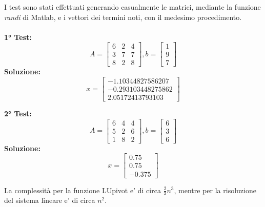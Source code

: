 \documentclass[10pt,a4paper]{article}
\begin{document}
I test sono stati effettuati generando casualmente le matrici, mediante la funzione \textit{randi} di Matlab, e i vettori dei termini noti,
con il medesimo procedimento.
\\ \\
\textbf{1° Test:}
\[
  A =
  \begin{bmatrix}
    6 & 2 & 4 \\
    3 & 7 & 7 \\
    8 & 2 & 8
  \end{bmatrix},
  b =
  \begin{bmatrix}
    1 \\ 9 \\ 7
  \end{bmatrix}
\]
\textbf{Soluzione:}
\[
  x =
  \begin{bmatrix}
    -1.10344827586207  \\
    -0.293103448275862 \\
    2.05172413793103
  \end{bmatrix}
\]

\textbf{2° Test:}
\[
  A =
  \begin{bmatrix}
    6 & 4 & 4 \\
    5 & 2 & 6 \\
    1 & 8 & 2
  \end{bmatrix},
  b =
  \begin{bmatrix}
    6 \\ 3 \\ 6
  \end{bmatrix}
\]
\textbf{Soluzione:}
\[
  x =
  \begin{bmatrix}
    0.75 \\
    0.75 \\
    -0.375
  \end{bmatrix}
\]

La complessità per la funzione LUpivot e' di circa $ \frac{2}{3}n^3 $, mentre per la risoluzione del sistema lineare e' di circa $ n^2 $.
\end{document}
